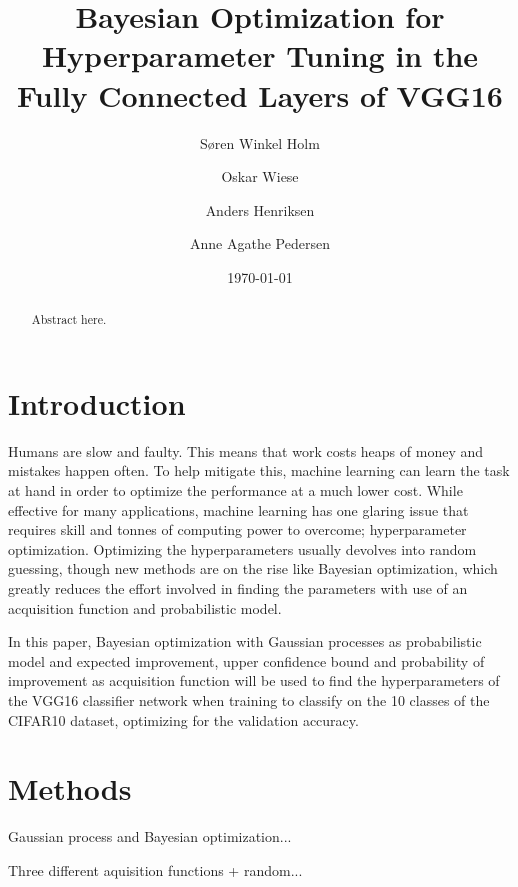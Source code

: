 \documentclass[12pt,fleqn]{article}
\title{Bayesian Optimization for Hyperparameter Tuning in the Fully Connected Layers of VGG16}
\author{Søren Winkel Holm\and Oskar Wiese\and Anders Henriksen\and Anne Agathe Pedersen}
\date{\today}
\begin{document}
\maketitle

\begin{abstract}
Abstract here. 
\end{abstract}


\section{Introduction}


Humans are slow and faulty. This means that work costs heaps of money and mistakes happen often. To help mitigate this, machine learning can learn the task at hand in order to optimize the performance at a much lower cost. While effective for many applications, machine learning has one glaring issue that requires skill and tonnes of computing power to overcome; hyperparameter optimization. Optimizing the hyperparameters usually devolves into random guessing, though new methods are on the rise like Bayesian optimization, which greatly reduces the effort involved in finding the parameters with use of an acquisition function and probabilistic model.

In this paper, Bayesian optimization with Gaussian processes as probabilistic model and expected improvement, upper confidence bound and probability of improvement as acquisition function will be used to find the hyperparameters of the VGG16 classifier network when training to classify on the 10 classes of the CIFAR10 dataset, optimizing for the validation accuracy.


\section{Methods}
Gaussian process and Bayesian optimization...

Three different aquisition functions + random...
\end{document}

